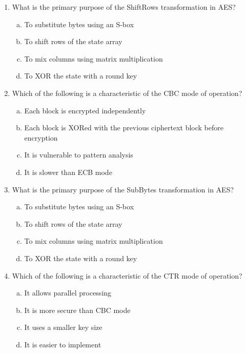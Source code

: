\documentclass[12pt]{article}
\begin{document}
\begin{enumerate}
    \item What is the primary purpose of the ShiftRows transformation in AES?
    \begin{enumerate}[(a)]
        \item To substitute bytes using an S-box
        \item To shift rows of the state array
        \item To mix columns using matrix multiplication
        \item To XOR the state with a round key
    \end{enumerate}

    \item Which of the following is a characteristic of the CBC mode of operation?
    \begin{enumerate}[(a)]
        \item Each block is encrypted independently
        \item Each block is XORed with the previous ciphertext block before encryption
        \item It is vulnerable to pattern analysis
        \item It is slower than ECB mode
    \end{enumerate}

    \item What is the primary purpose of the SubBytes transformation in AES?
    \begin{enumerate}[(a)]
        \item To substitute bytes using an S-box
        \item To shift rows of the state array
        \item To mix columns using matrix multiplication
        \item To XOR the state with a round key
    \end{enumerate}

    \item Which of the following is a characteristic of the CTR mode of operation?
    \begin{enumerate}[(a)]
        \item It allows parallel processing
        \item It is more secure than CBC mode
        \item It uses a smaller key size
        \item It is easier to implement
    \end{enumerate}


\end{enumerate}
\end{document}
